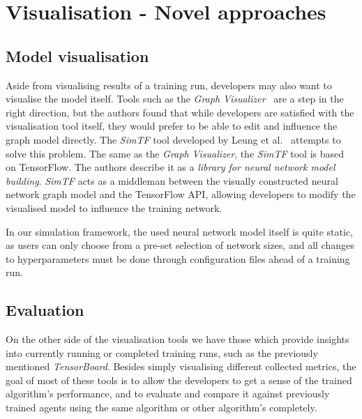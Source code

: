 \section{Visualisation - Novel approaches}

\subsection{Model visualisation}

Aside from visualising results of a training run, developers may also want to visualise the model itself. Tools such as the \emph{Graph Visualizer}~\cite{GraphVisualizer} are a step in the right direction, but the authors found that while developers are satisfied with the visualisation tool itself, they would prefer to be able to edit and influence the graph model directly. The \emph{SimTF} tool developed by Leung et al.~\cite{NeuralNetworkVisualization} attempts to solve this problem. The same as the \emph{Graph Visualizer}, the \emph{SimTF} tool is based on TensorFlow. The authors describe it as a \emph{library for neural network model building}. \emph{SimTF} acts as a middleman between the visually constructed neural network graph model and the TensorFlow API, allowing developers to modify the visualised model to influence the training network.

In our simulation framework, the used neural network model itself is quite static, as users can only choose from a pre-set selection of network sizes, and all changes to hyperparameters must be done through configuration files ahead of a training run.

\subsection{Evaluation}

On the other side of the visualisation tools we have those which provide insights into currently running or completed training runs, such as the previously mentioned \emph{TensorBoard}. Besides simply visualising different collected metrics, the goal of most of these tools is to allow the developers to get a sense of the trained algorithm's performance, and to evaluate and compare it against previously trained agents using the same algorithm or other algorithm's completely.

